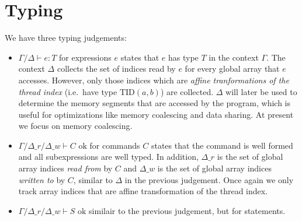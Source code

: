 \documentclass{article}
\newcommand{\of}{\!:\!}
\newcommand{\ok}{\text{ ok}}
\newcommand{\tid}[2]{\text{TID}(#1, #2)}
\renewcommand{\|}{\:|\:}
\begin{document}
\section{Typing}
We have three typing judgements: 
\begin{itemize} 
\item ${\Gamma}/{\Delta} {\vdash} e \of T$ for expressions $e$ states that $e$ has type $T$ in the context ${\Gamma}$. The context ${\Delta}$ collects the set of indices read by $e$ for every global array that $e$ accesses. However, only those indices which are \emph{affine tranformations of the thread index} (i.e.\ have type $\tid{a}{b}$) are collected. ${\Delta}$ will later be used to determine the memory segments that are accessed by the program, which is useful for optimizations like memory coalescing and data sharing. At present we focus on memory coalescing.

\item ${\Gamma}/{\Delta}\_r/{\Delta}\_w {\vdash} C \ok$ for commands $C$ states that the command is well formed and all subexpressions are well typed. In addition, ${\Delta}\_r$ is the set of global array indices \emph{read from} by $C$ and ${\Delta}\_w$ is the set of global array indices \emph{written to} by $C$, similar to ${\Delta}$ in the previous judgement. Once again we only track array indices that are affine transformation of the thread index.

\item ${\Gamma}/{\Delta}\_r/{\Delta}\_w {\vdash} S \ok$ similair to the previous judgement, but for statements.
\end{itemize}
\end{document}
